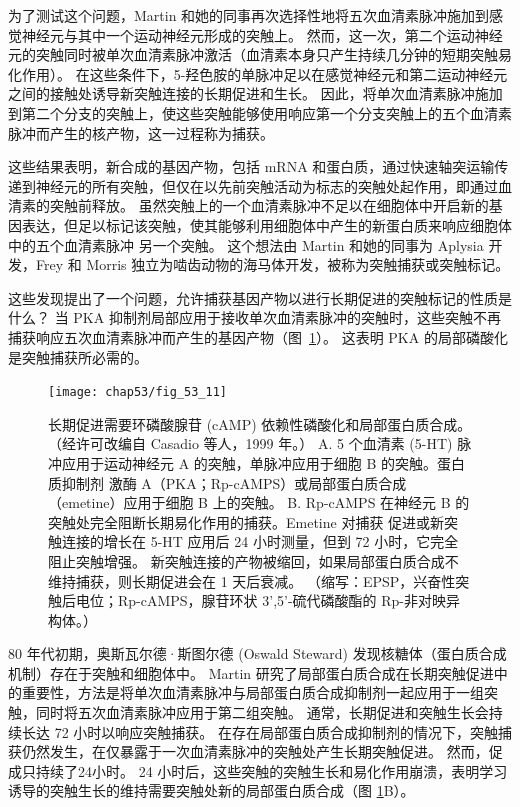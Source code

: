 为了测试这个问题，Martin 和她的同事再次选择性地将五次血清素脉冲施加到感觉神经元与其中一个运动神经元形成的突触上。
然而，这一次，第二个运动神经元的突触同时被单次血清素脉冲激活（血清素本身只产生持续几分钟的短期突触易化作用）。
在这些条件下，5-羟色胺的单脉冲足以在感觉神经元和第二运动神经元之间的接触处诱导新突触连接的长期促进和生长。
因此，将单次血清素脉冲施加到第二个分支的突触上，使这些突触能够使用响应第一个分支突触上的五个血清素脉冲而产生的核产物，这一过程称为捕获。


这些结果表明，新合成的基因产物，包括 mRNA 和蛋白质，通过快速轴突运输传递到神经元的所有突触，但仅在以先前突触活动为标志的突触处起作用，即通过血清素的突触前释放。
虽然突触上的一个血清素脉冲不足以在细胞体中开启新的基因表达，但足以标记该突触，使其能够利用细胞体中产生的新蛋白质来响应细胞体中的五个血清素脉冲 另一个突触。
这个想法由 Martin 和她的同事为 Aplysia 开发，Frey 和 Morris 独立为啮齿动物的海马体开发，被称为突触捕获或突触标记。


这些发现提出了一个问题，允许捕获基因产物以进行长期促进的突触标记的性质是什么？
当 PKA 抑制剂局部应用于接收单次血清素脉冲的突触时，这些突触不再捕获响应五次血清素脉冲而产生的基因产物（图~\ref{fig:53_11}）。
这表明 PKA 的局部磷酸化是突触捕获所必需的。


\begin{figure}[htbp]
	\centering
	\texttt{[image: chap53/fig\_53\_11]}
	\caption{长期促进需要环磷酸腺苷 (cAMP) 依赖性磷酸化和局部蛋白质合成。 （经许可改编自 Casadio 等人，1999 年。） A. 5 个血清素 (5-HT) 脉冲应用于运动神经元 A 的突触，单脉冲应用于细胞 B 的突触。蛋白质抑制剂 激酶 A（PKA；Rp-cAMPS）或局部蛋白质合成（emetine）应用于细胞 B 上的突触。 B. Rp-cAMPS 在神经元 B 的突触处完全阻断长期易化作用的捕获。Emetine 对捕获 促进或新突触连接的增长在 5-HT 应用后 24 小时测量，但到 72 小时，它完全阻止突触增强。 新突触连接的产物被缩回，如果局部蛋白质合成不维持捕获，则长期促进会在 1 天后衰减。 （缩写：EPSP，兴奋性突触后电位；Rp-cAMPS，腺苷环状 3',5'-硫代磷酸酯的 Rp-非对映异构体。）}
	\label{fig:53_11}
\end{figure}


80 年代初期，奥斯瓦尔德·斯图尔德 (Oswald Steward) 发现核糖体（蛋白质合成机制）存在于突触和细胞体中。
Martin 研究了局部蛋白质合成在长期突触促进中的重要性，方法是将单次血清素脉冲与局部蛋白质合成抑制剂一起应用于一组突触，同时将五次血清素脉冲应用于第二组突触。
通常，长期促进和突触生长会持续长达 72 小时以响应突触捕获。
在存在局部蛋白质合成抑制剂的情况下，突触捕获仍然发生，在仅暴露于一次血清素脉冲的突触处产生长期突触促进。
然而，促成只持续了24小时。
24 小时后，这些突触的突触生长和易化作用崩溃，表明学习诱导的突触生长的维持需要突触处新的局部蛋白质合成（图 \ref{fig:53_11}B）。



